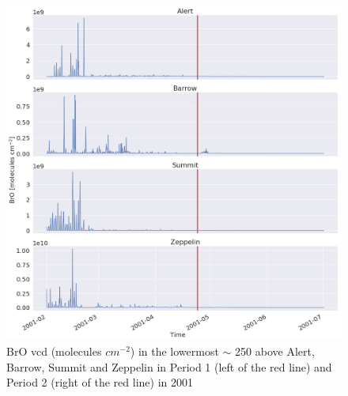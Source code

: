\begin{figure}[h]
    \centering
    \includegraphics[width=\linewidth]{Chapter6_Results/images/Vert_StationComp_2001/BrO_VCD_2001.png}
    \caption{BrO \acrlong{vcd} (molecules $ cm^{-2}$) in the lowermost $\sim$ 250 above Alert, Barrow, Summit and Zeppelin in Period 1 (left of the red line) and Period 2 (right of the red line) in 2001}
    \label{fig:BrO_VCD_2001}
\end{figure}